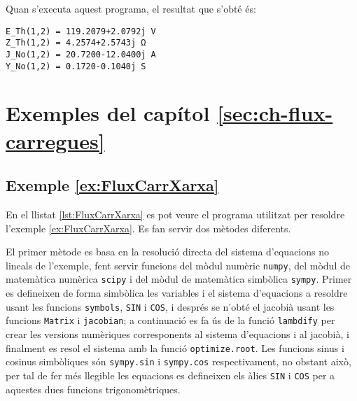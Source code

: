 Quan s'executa aquest programa, el resultat que s'obté és:
\lstset{
	language=,
	numbers=none,
	frame=none
}
\begin{lstlisting}
E_Th(1,2) = 119.2079+2.0792j V
Z_Th(1,2) = 4.2574+2.5743j Ω
J_No(1,2) = 20.7200-12.0400j A
Y_No(1,2) = 0.1720-0.1040j S
\end{lstlisting} 



\section{Exemples del capítol \ref*{sec:ch-flux-carregues}}

\hypertarget{exemple:FluxCarrXarxa}{\subsection{Exemple \ref*{ex:FluxCarrXarxa} \FluxCarrXarxa}}
En el llistat \vref{lst:FluxCarrXarxa} es pot veure el programa utilitzat per resoldre l'exemple \vref{ex:FluxCarrXarxa}. Es fan servir dos mètodes diferents.

El primer mètode es basa en la resolució directa del sistema d'equacions no lineals de l'exemple, fent servir funcions del mòdul numèric \texttt{numpy}, del mòdul de matemàtica numèrica \texttt{scipy} i del mòdul de matemàtica simbòlica \texttt{sympy}. Primer es defineixen de forma simbòlica les variables i el sistema d'equacions a resoldre usant les funcions \texttt{symbols}, \texttt{SIN} i \texttt{COS}, i després se n'obté el jacobià usant les funcions \texttt{Matrix} i \texttt{jacobian}; a continuació es fa ús de la funció  \texttt{lambdify} per crear les versions numèriques corresponents al sistema d'equacions i al jacobià, i finalment es resol el sistema amb la funció \texttt{optimize.root}. Les funcions sinus i cosinus simbòliques són  \texttt{sympy.sin} i  \texttt{sympy.cos} respectivament, no obstant això,  per tal de fer més llegible les equacions es defineixen els àlies \texttt{SIN} i \texttt{COS} per a aquestes dues funcions trigonomètriques.

